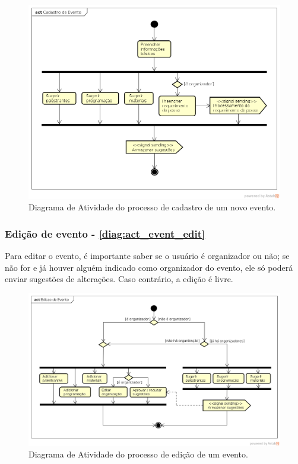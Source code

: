 \documentclass[12pt,a4paper,twoside,hyphens,english,brazil]{abntex2}
\begin{document}
{\begin{figure}
	\centering
	\includegraphics[width=1\linewidth]{diagramas/comuns/act_event_new.png}
	\caption{Diagrama de Atividade do processo de cadastro de um novo evento.}
	\label{diag:act_event_new}
\end{figure}

\subsubsection*{Edição de evento - \autoref{diag:act_event_edit}}
Para editar o evento, é importante saber se o usuário é organizador ou não; se não for e já houver alguém indicado como organizador do evento, ele só poderá enviar sugestões de alterações. Caso contrário, a edição é livre.
\begin{figure}
	\centering
	\includegraphics[width=1\linewidth]{diagramas/comuns/act_event_edit.png}
	\caption{Diagrama de Atividade do processo de edição de um evento.}
		\label{diag:act_event_edit}
\end{figure}

}
\end{document}
